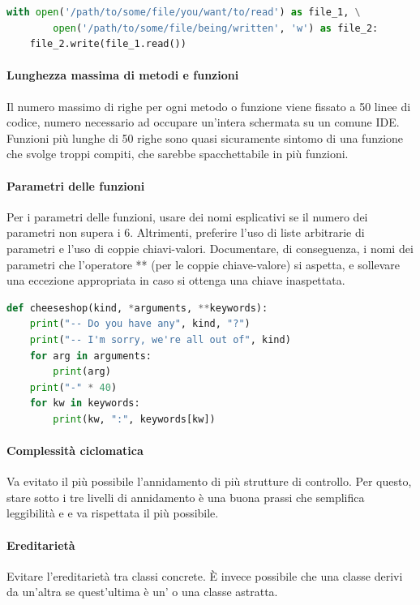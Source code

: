 		\begin{lstlisting}[language=Python]
with open('/path/to/some/file/you/want/to/read') as file_1, \
        open('/path/to/some/file/being/written', 'w') as file_2:
	file_2.write(file_1.read())
		\end{lstlisting}


		\paragraph{Lunghezza massima di metodi e funzioni}\label{PP:Sviluppo:Codifica:LunghezzaMassimaDeiMetodi}
		Il numero massimo di righe per ogni metodo o funzione viene fissato a 50 linee di codice, numero necessario ad occupare un'intera
		schermata su un comune IDE. Funzioni più lunghe di 50 righe sono quasi sicuramente sintomo di una funzione che svolge troppi compiti,
		che sarebbe spacchettabile in più funzioni.

		\paragraph{Parametri delle funzioni}\label{PP:Sviluppo:Codifica:ParametriDelleFunzioni}
		Per i parametri delle funzioni, usare dei nomi esplicativi se il numero dei parametri non supera i 6. Altrimenti, preferire l'uso di liste
		arbitrarie di parametri e l'uso di coppie chiavi-valori. Documentare, di conseguenza,
		i nomi dei parametri che l'operatore ** (per le coppie chiave-valore) si aspetta, e sollevare una eccezione appropriata in caso si ottenga una chiave
		inaspettata.
\begin{lstlisting}[language=Python]
def cheeseshop(kind, *arguments, **keywords):
    print("-- Do you have any", kind, "?")
    print("-- I'm sorry, we're all out of", kind)
    for arg in arguments:
        print(arg)
    print("-" * 40)
    for kw in keywords:
        print(kw, ":", keywords[kw])
\end{lstlisting}

        \paragraph{Complessità ciclomatica}\label{PP:Sviluppo:Codifica:ComplessitàCiclomatica}
		Va evitato il più possibile l'annidamento di più strutture di controllo. Per questo, stare sotto i tre livelli di annidamento è una buona
		prassi che semplifica leggibilità e \gloss{debugging} e va rispettata il più possibile.


		\paragraph{Ereditarietà}\label{PP:Sviluppo:Codifica:Ereditarietà}
		Evitare l'ereditarietà tra classi concrete. È invece possibile che una classe derivi da un'altra se quest'ultima è
		un'\gloss{interfaccia} o una classe astratta.

